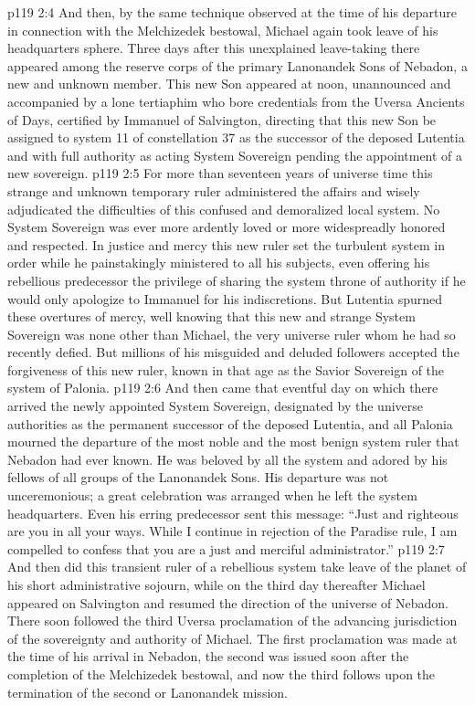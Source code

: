 \vs p119 2:4 And then, by the same technique observed at the time of his departure in connection with the Melchizedek bestowal, Michael again took leave of his headquarters sphere. Three days after this unexplained leave\hyp{}taking there appeared among the reserve corps of the primary Lanonandek Sons of Nebadon, a new and unknown member. This new Son appeared at noon, unannounced and accompanied by a lone tertiaphim who bore credentials from the Uversa Ancients of Days, certified by Immanuel of Salvington, directing that this new Son be assigned to system 11 of constellation 37 as the successor of the deposed Lutentia and with full authority as acting System Sovereign pending the appointment of a new sovereign.
\vs p119 2:5 For more than seventeen years of universe time this strange and unknown temporary ruler administered the affairs and wisely adjudicated the difficulties of this confused and demoralized local system. No System Sovereign was ever more ardently loved or more widespreadly honored and respected. In justice and mercy this new ruler set the turbulent system in order while he painstakingly ministered to all his subjects, even offering his rebellious predecessor the privilege of sharing the system throne of authority if he would only apologize to Immanuel for his indiscretions. But Lutentia spurned these overtures of mercy, well knowing that this new and strange System Sovereign was none other than Michael, the very universe ruler whom he had so recently defied. But millions of his misguided and deluded followers accepted the forgiveness of this new ruler, known in that age as the Savior Sovereign of the system of Palonia.
\pc \vs p119 2:6 And then came that eventful day on which there arrived the newly appointed System Sovereign, designated by the universe authorities as the permanent successor of the deposed Lutentia, and all Palonia mourned the departure of the most noble and the most benign system ruler that Nebadon had ever known. He was beloved by all the system and adored by his fellows of all groups of the Lanonandek Sons. His departure was not unceremonious; a great celebration was arranged when he left the system headquarters. Even his erring predecessor sent this message: “Just and righteous are you in all your ways. While I continue in rejection of the Paradise rule, I am compelled to confess that you are a just and merciful administrator.”\plusone
\vs p119 2:7 And then did this transient ruler of a rebellious system take leave of the planet of his short administrative sojourn, while on the third day thereafter Michael appeared on Salvington and resumed the direction of the universe of Nebadon. There soon followed the third Uversa proclamation of the advancing jurisdiction of the sovereignty and authority of Michael. The first proclamation was made at the time of his arrival in Nebadon, the second was issued soon after the completion of the Melchizedek bestowal, and now the third follows upon the termination of the second or Lanonandek mission.
